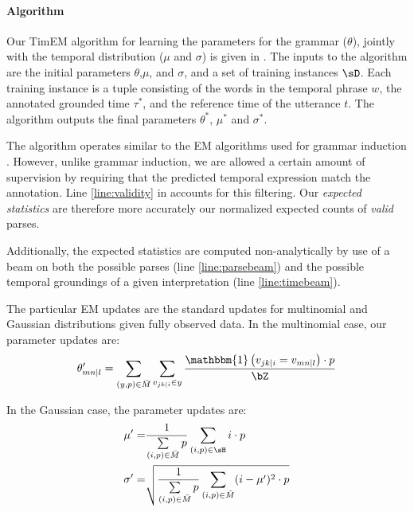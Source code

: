 \paragraph{Algorithm}
Our TimEM algorithm for learning the parameters for the grammar ($\theta$),
	jointly with the temporal distribution ($\mu$ and $\sigma$) is given 
	in .
The inputs to the algorithm are the initial parameters $\theta$,$\mu$, and
	$\sigma$, and a set of training instances $\sD$.
Each training instance is a tuple consisting of the words in the temporal
	phrase $w$, the annotated grounded time $\tau^*$, and the reference time
	of the utterance $t$.
The algorithm outputs the final parameters $\theta^*$, $\mu^*$ and $\sigma^*$.

The algorithm operates similar to the EM algorithms used for grammar induction
	\cite{key:2004klein-induction,key:1992carroll-induction}.
However, unlike grammar induction, we are allowed a certain amount of
	supervision by requiring that the predicted temporal expression
	match the annotation.
Line \ref{line:validity} in  accounts for this filtering.
Our \textit{expected statistics} are therefore more accurately our normalized
	expected counts of \textit{valid} parses.

Additionally, the expected statistics are computed non-analytically by use of
	a beam on both the possible parses (line \ref{line:parsebeam}) and the
	possible temporal groundings of a given interpretation (line
	\ref{line:timebeam}).

The particular EM updates are the standard
	updates for multinomial and Gaussian distributions given fully observed data.
In the multinomial case, our parameter updates are:
\begin{equation}
	\theta_{mn \mid l}' =
		\sum\limits_{(y,p) \in \bar M} \sum\limits_{v_{jk \mid i} \in y}
		\frac{
			\mathbbm{1}\left(v_{jk \mid i} = v_{mn \mid l}\right) \cdot p
		}{
			\bZ
		}
\label{eqn:multinomialEM}
\end{equation}

In the Gaussian case, the parameter updates are:
\begin{align}
	\mu' =&
		\frac{ 1 } { \sum\limits_{(i,p) \in \bar M}  p }
		\sum\limits_{(i,p) \in \sH} i \cdot p \\
	\sigma' =& \sqrt{
		\frac{ 1 } { \sum\limits_{(i,p) \in \bar M}  p }
		\sum\limits_{(i,p) \in \bar M} (i-\mu')^2 \cdot p
	}
\label{eqn:gaussianEM}
\end{align}

